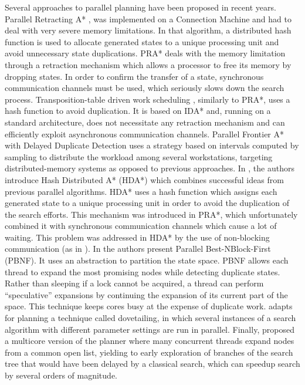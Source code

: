 \documentclass{sig-alternate}
\begin{document}
Several approaches to parallel planning have been proposed in recent years.
Parallel Retracting A* \cite{PRA-star}, was implemented on a Connection Machine
and had to deal with very severe memory limitations. In that algorithm, a
distributed hash function is used to allocate generated states to a unique
processing unit and avoid unnecessary state duplications. PRA* deals with the
memory limitation through a retraction mechanism which allows a processor to free
its memory by dropping states. In order to confirm the transfer of a state,
synchronous communication channels must be used, which seriously slows down the
search process. Transposition-table driven work scheduling \cite{TDS}, similarly
to PRA*, uses a hash function to avoid duplication. It is based on IDA* and,
running on a standard architecture, does not necessitate any retraction
mechanism and can efficiently exploit asynchronous communication channels.
Parallel Frontier A* with Delayed Duplicate Detection \cite{PFADDD} uses a
strategy based on intervals computed by sampling to distribute the workload
among several workstations, targeting distributed-memory systems as opposed to
previous approaches. In \cite{HDA-star}, the authors introduce Hash Distributed
A* (HDA*) which combines successful ideas from previous parallel algorithms.
HDA* uses a hash function which assigns each generated state to a unique
processing unit in order to avoid the duplication of the search efforts. This
mechanism was introduced in PRA*, which unfortunately combined it with
synchronous communication channels which cause a lot of waiting. This problem
was addressed in HDA* by the use of non-blocking communication (as in
\cite{TDS}). In \cite{burns:ijcai2009,burns:JAIR2010} the authors present
Parallel Best-NBlock-First (PBNF). It uses an abstraction to partition the state
space. PBNF allows each thread to expand the most promising nodes while
detecting duplicate states. Rather than sleeping if a lock cannot be acquired, a
thread can perform ``speculative'' expansions by continuing the expansion of its
current part of the space. This technique keeps cores busy at the expense of
duplicate work. \cite{dovetailing} adapts for planning a technique called
dovetailing, in which several instances of a search algorithm with different
parameter settings are run in parallel. Finally, \cite{vidal:socs2010} proposed
a multicore version of the planner \cite{yahsp:icaps2004} where many concurrent
threads expand nodes from a common open list, yielding to early exploration of
branches of the search tree that would have been delayed by a classical search,
which can speedup search by several orders of magnitude.
\end{document}
